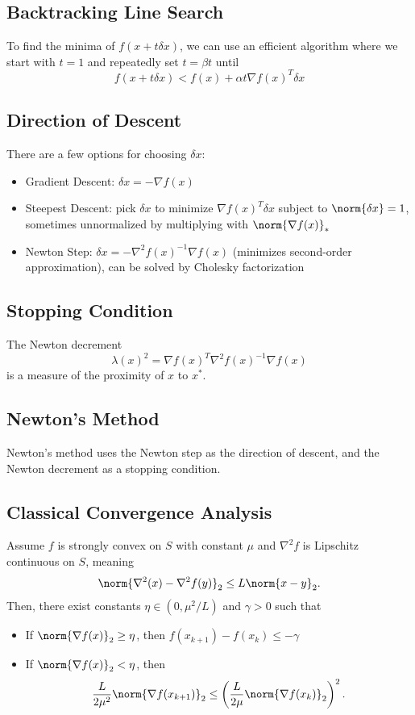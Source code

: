 \documentclass[11pt]{article}
\begin{document}
\subsection{Backtracking Line Search} 
To find the minima of $f(x + t\delta x)$, we can use an efficient algorithm where we start with $t = 1$ and repeatedly set $t = \beta t$ until 
\[ f(x + t\delta x) < f(x) + \alpha t \nabla f(x)^T \delta x \] 

\subsection{Direction of Descent} 
There are a few options for choosing $\delta x$: 
\begin{itemize}
    \item Gradient Descent: $\delta x = -\nabla f(x)$
    \item Steepest Descent: pick $\delta x$ to minimize $\nabla f(x)^T \delta x$ subject to $\norm{\delta x} = 1$, sometimes unnormalized by multiplying with $\norm{\nabla f(x)}_*$
    \item Newton Step: $\delta x = -\nabla^2 f(x)^{-1} \nabla f(x)$ (minimizes second-order approximation), can be solved by Cholesky factorization
\end{itemize}

\subsection{Stopping Condition} 
The Newton decrement 
\[ \lambda(x)^2 = \nabla f(x)^T \nabla^2 f(x)^{-1} \nabla f(x) \] 
is a measure of the proximity of $x$ to $x^*$. 

\subsection{Newton's Method} 
Newton's method uses the Newton step as the direction of descent, and the Newton decrement as a stopping condition. \par

\subsection{Classical Convergence Analysis} 
Assume $f$ is strongly convex on $S$ with constant $\mu$ and $\nabla^2 f$ is Lipschitz continuous on $S$, meaning 
\[ \norm{\nabla^2 (x) - \nabla^2 f(y)}_2 \leq L \norm{x - y}_2. \] 
Then, there exist constants $\eta \in (0, \mu^2/L)$ and $\gamma > 0$ such that 
\begin{itemize}
    \item If $\norm{\nabla f(x)}_2 \geq \eta$, then $f(x_{k+1}) - f(x_k) \leq -\gamma$ 
    \item If $\norm{\nabla f(x)}_2 < \eta$, then 
    \[ \frac{L}{2\mu^2} \norm{\nabla f(x_{k+1})}_2 \leq \left( \frac{L}{2\mu} \norm{\nabla f(x_k)}_2 \right)^2. \] 
\end{itemize}
\end{document}
